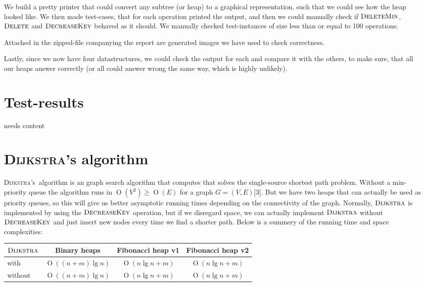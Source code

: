 \documentclass[oneside,11pt,openright]{report}
\newcommand{\BigO}[1]{\ensuremath{\operatorname{O}\left(#1\right)}}
\newcommand{\DeleteMin}{\textsc{DeleteMin}}
\newcommand{\DecreaseKey}{\textsc{DecreaseKey}}
\newcommand{\Delete}{\textsc{Delete}}
\newcommand{\Dijkstra}{\textsc{Dijkstra}}
\begin{document}
We build a pretty printer that could convert any subtree (or heap) to a graphical representation, such that we could see how the heap looked like. We then made test-cases, that for each operation printed the output, and then we could manually check if $\DeleteMin$, $\Delete$ and $\DecreaseKey$ behaved as it should. We manually checked test-instances of size less than or equal to 100 operations.

Attached in the zipped-file companying the report are generated images we have used to check correctness.

Lastly, since we now have four datastructures, we could check the output for each and compare it with the others, to make sure, that all our heaps answer correctly (or all could answer wrong the same way, which is highly unlikely).

\chapter{Test-results}

needs content

\chapter{\Dijkstra's algorithm}

\Dijkstra's~algorithm is an graph search algorithm that computes that solves the single-source shortest path problem. Without a min-priority queue the algorithm runs in $\BigO{V^2} \ge \BigO{E}$ for a graph $G=(V, E)$[3]. But we have two heaps that can actually be used as priority queues, so this will give us better asymptotic running times depending on the connectivity of the graph.
Normally, $\Dijkstra$ is implemented by using the $\DecreaseKey$ operation, but if we disregard space, we can actually implement $\Dijkstra$ without $\DecreaseKey$ and just insert new nodes every time we find a shorter path. Below is a summery of the running time and space complexities:

\begin{center}
  \begin{tabular}{ l | c | c | c}
    $\Dijkstra$ & Binary heaps & Fibonacci heap v1 & Fibonacci heap v2 \\ \hline
    with & $\BigO{(n+m)\lg n}$ & $\BigO{n\lg n + m}$ & $\BigO{n\lg n + m}$ \\
    without & $\BigO{(n+m)\lg n}$ & $\BigO{n\lg n + m}$ & $\BigO{n\lg n + m}$ \\     
  \end{tabular}
\end{center}
\end{document}
